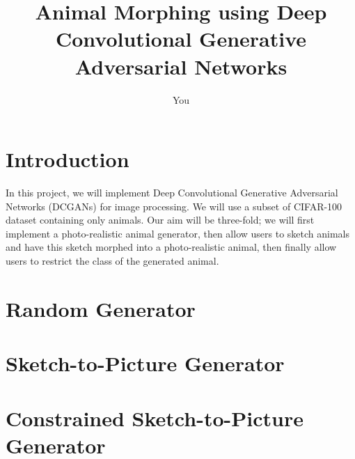 \documentclass[a4paper]{article}
\title{Animal Morphing using Deep Convolutional Generative Adversarial Networks}
\author{
	You
}
\begin{document}
\maketitle


\section{Introduction}
In this project, we will implement Deep Convolutional Generative Adversarial Networks (DCGANs) for image processing. We will use a subset of CIFAR-100 dataset containing only animals. Our aim will be three-fold; we will first implement a photo-realistic animal generator, then allow users to sketch animals and have this sketch morphed into a photo-realistic animal, then finally allow users to restrict the class of the generated animal.


\section{Random Generator}

\section{Sketch-to-Picture Generator}


\section{Constrained Sketch-to-Picture Generator}
\end{document}
